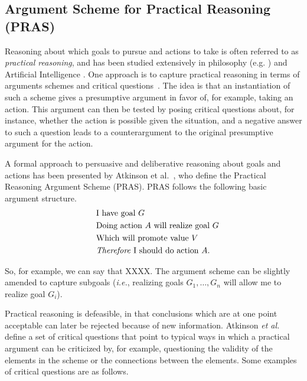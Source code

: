 \documentclass[11.5pt,two column]{llncs}
\begin{document}
\subsection{Argument Scheme for Practical Reasoning (PRAS)} 
\label{sect:background:pras}

Reasoning about which goals to pursue and actions to take is often referred to as \emph{practical reasoning}, and has been studied extensively in philosophy (e.g. \cite{raz1978, walton1990}) and Artificial Intelligence \cite{bratman1987, atkinson2007}. One approach is to capture practical reasoning in terms of arguments schemes and critical questions~\cite{walton1990}. The idea is that an instantiation of such a scheme gives a presumptive argument in favor of, for example, taking an action. This argument can then be tested by posing critical questions about, for instance, whether the action is possible given the situation, and a negative answer to such a question leads to a counterargument to the original presumptive argument for the action. 

A formal approach to persuasive and deliberative reasoning about goals and actions has been presented by Atkinson et al.~\cite{atkinson2007}, who define the Practical Reasoning Argument Scheme (PRAS). PRAS follows the following basic argument structure. 
\begin{equation}
\label{eq:eq1}
  \begin{aligned}
 \qquad&\text{I have goal } G&\\
&\text{Doing action }A \text{ will realize goal }G&\\
&\text{Which will promote value }V&\\
&\text{\emph{Therefore} I should do action }A.&
  \end{aligned}
\end{equation}

So, for example, we can say that XXXX. The argument scheme can be slightly amended to capture subgoals (\emph{i.e.}, realizing goals $G_1, \ldots, G_n$ will allow me to realize goal $G_i$). 

Practical reasoning is defeasible, in that conclusions which are at one point acceptable can later be rejected because of new information. Atkinson \emph{et al.}~\cite{atkinson2007} define a set of critical questions that point to typical ways in which a practical argument can be criticized by, for example, questioning the validity of the elements in the scheme or the connections between the elements. Some examples of critical questions are as follows.
\end{document}
